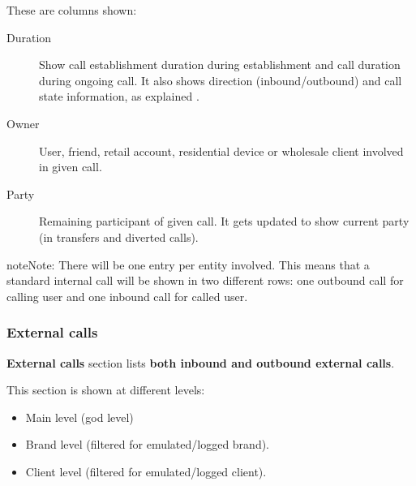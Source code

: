 \documentclass[letterpaper,10pt,english]{sphinxmanual}
\begin{document}
These are columns shown:
\begin{description}
\item[{Duration}] \leavevmode{}\label{administration_portal/client/retail/calls/active_calls:term-duration}
Show call establishment duration during establishment and call duration during ongoing call. It also shows
direction (inbound/outbound) and call state information, as explained {\hyperref[administration_portal/platform/active_calls:call\string-state]{}}.

\item[{Owner}] \leavevmode{}\label{administration_portal/client/retail/calls/active_calls:term-owner}
User, friend, retail account, residential device or wholesale client involved in given call.

\item[{Party}] \leavevmode{}\label{administration_portal/client/retail/calls/active_calls:term-party}
Remaining participant of given call. It gets updated to show current party (in transfers and diverted calls).

\end{description}

\begin{notice}{note}{Note:}
There will be one entry per entity involved. This means that a standard internal call will be shown
in two different rows: one outbound call for calling user and one inbound call for called user.
\end{notice}


\subsubsection{External calls}
\label{administration_portal/client/retail/calls/external_calls:id1}\label{administration_portal/client/retail/calls/external_calls::doc}\label{administration_portal/client/retail/calls/external_calls:external-calls}
\textbf{External calls} section lists \textbf{both inbound and outbound external calls}.

This section is shown at different levels:
\begin{itemize}
\item {} 
Main level (god level)

\item {} 
Brand level (filtered for emulated/logged brand).

\item {} 
Client level (filtered for emulated/logged client).

\end{itemize}
\end{document}
